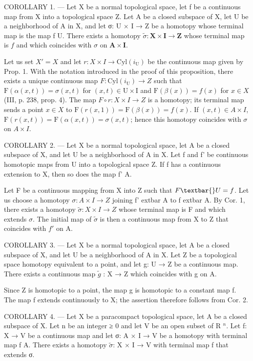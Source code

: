 COROLLARY 1. --- Let X be a normal topological space, let f be a continuous map from X into a topological space Z. Let A be a closed subspace of X, let U be a neighborhood of A in X, and let σ: U × I → Z be a homotopy whose terminal map is the map f \textbar{} U. There exists a homotopy \(\widetilde{\sigma}\colon\mathbf{X}\times\mathbf{I}\to\mathbf{Z}\) whose terminal map is \(f\) and which coincides with \(\sigma\) on \(\mathbf{A}\times\mathbf{I}\).

Let us set \(X' = X\) and let \(r: X \times I \to \text{Cyl}(i_{\text{U}})\) be the continuous map given by Prop. 1. With the notation introduced in the proof of this proposition, there exists a unique continuous map \(F: \text{Cyl}(i_{\text{U}}) \to Z\) such that \(\text{F}(\alpha(x,t)) = \sigma(x,t)\) for \((x,t) \in \text{U} \times \text{I}\) and \(\text{F}(\beta(x)) = f(x)\) for \(x \in X\) (III, p. 238, prop. 4). The map \(F \circ r: X \times I \to Z\) is a homotopy; its terminal map sends a point \(x \in X\) to \(\text{F}(r(x,1)) = \text{F}(\beta(x)) = f(x)\). If \((x,t) \in A \times I\), \(\text{F}(r(x,t)) = \text{F}(\alpha(x,t)) = \sigma(x,t)\); hence this homotopy coincides with \(\sigma\) on \(A \times I\).

COROLLARY 2. --- Let X be a normal topological space, let A be a closed subspace of X, and let U be a neighborhood of A in X. Let f and f' be continuous homotopic maps from U into a topological space Z. If f has a continuous extension to X, then so does the map f' \textbar{} A.

Let F be a continuous mapping from X into Z such that \(F \textbar{} U = f\). Let us choose a homotopy \(\sigma\colon A \times I \to Z\) joining f'	extbar{} A to f	extbar{} A. By Cor. 1, there exists a homotopy \(\widetilde{\sigma}\colon X \times I \to Z\) whose terminal map is F and which extends \(\sigma\). The initial map of \(\widetilde{\sigma}\) is then a continuous map from X to Z that coincides with \(f'\) on A.

COROLLARY 3. — Let X be a normal topological space, let A be a closed subspace of X, and let U be a neighborhood of A in X. Let Z be a topological space homotopy equivalent to a point, and let g: U → Z be a continuous map. There exists a continuous map \(\widetilde{g}\) : X → Z which coincides with g on A.

Since Z is homotopic to a point, the map g is homotopic to a constant map f. The map f extends continuously to X; the assertion therefore follows from Cor. 2.

COROLLARY 4. --- Let X be a paracompact topological space, let A be a closed subspace of X. Let n be an integer ≥ 0 and let V be an open subset of R \(^{n}\). Let f: X → V be a continuous map and let σ: A × I → V be a homotopy with terminal map f \textbar{} A. There exists a homotopy \(\widetilde{\sigma}\): X × I → V with terminal map f that extends σ.

